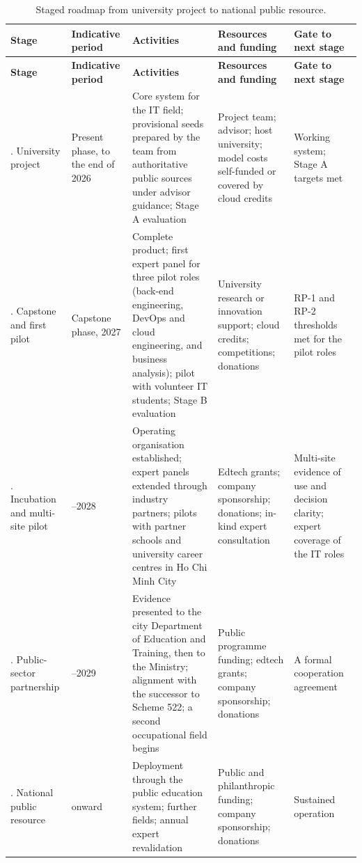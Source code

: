 {\small
\begin{longtable}{|>{\raggedright\arraybackslash}p{}|>{\raggedright\arraybackslash}p{}|>{\raggedright\arraybackslash}p{}|>{\raggedright\arraybackslash}p{}|>{\raggedright\arraybackslash}p{}|}
\caption{Staged roadmap from university project to national public resource.} \\
\hline
\textbf{Stage} & \textbf{Indicative period} & \textbf{Activities} & \textbf{Resources and funding} & \textbf{Gate to next stage} \\ \hline
\endfirsthead
\hline
\textbf{Stage} & \textbf{Indicative period} & \textbf{Activities} & \textbf{Resources and funding} & \textbf{Gate to next stage} \\ \hline
\endhead
0. University project & Present phase, to the end of 2026 & Core system for the IT field; provisional seeds prepared by the team from authoritative public sources under advisor guidance; Stage A evaluation & Project team; advisor; host university; model costs self-funded or covered by cloud credits & Working system; Stage A targets met \\ \hline
1. Capstone and first pilot & Capstone phase, 2027 & Complete product; first expert panel for three pilot roles (back-end engineering, DevOps and cloud engineering, and business analysis); pilot with volunteer IT students; Stage B evaluation & University research or innovation support; cloud credits; competitions; donations & RP-1 and RP-2 thresholds met for the pilot roles \\ \hline
2. Incubation and multi-site pilot & 2027--2028 & Operating organisation established; expert panels extended through industry partners; pilots with partner schools and university career centres in Ho Chi Minh City & Edtech grants; company sponsorship; donations; in-kind expert consultation & Multi-site evidence of use and decision clarity; expert coverage of the IT roles \\ \hline
3. Public-\allowbreak{}sector partnership & 2028--2029 & Evidence presented to the city Department of Education and Training, then to the Ministry; alignment with the successor to Scheme 522; a second occupational field begins & Public programme funding; edtech grants; company sponsorship; donations & A formal cooperation agreement \\ \hline
4. National public resource & 2030 onward & Deployment through the public education system; further fields; annual expert revalidation & Public and philanthropic funding; company sponsorship; donations & Sustained operation \\ \hline
\end{longtable}
}

